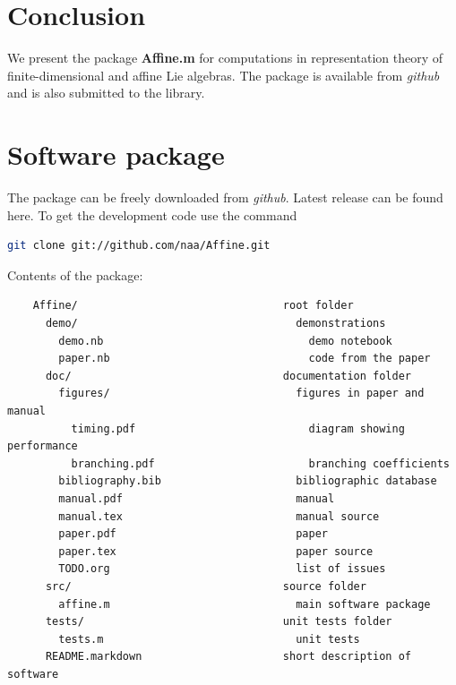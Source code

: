 \documentclass[preprint,12pt]{elsarticle}
\begin{document}
\section{Conclusion}
\label{sec:conclusion}
We present the package {\bf Affine.m} for computations in representation theory of finite-dimensional and affine Lie algebras. The package is available from {\it github} and is also submitted to the library.

\appendix

\section{Software package}
\label{package}
The package can be freely downloaded from {\it github}. Latest release can be found here. To get the development code use the command
\begin{lstlisting}[language=bash]
 git clone git://github.com/naa/Affine.git
\end{lstlisting}

Contents of the package:
\begin{verbatim}
    Affine/                                root folder
      demo/                                  demonstrations
        demo.nb                                demo notebook
        paper.nb                               code from the paper
      doc/                                 documentation folder
        figures/                             figures in paper and manual
          timing.pdf                           diagram showing performance
          branching.pdf                        branching coefficients
        bibliography.bib                     bibliographic database
        manual.pdf                           manual
        manual.tex                           manual source
        paper.pdf                            paper
        paper.tex                            paper source
        TODO.org                             list of issues
      src/                                 source folder
        affine.m                             main software package
      tests/                               unit tests folder
        tests.m                              unit tests
      README.markdown                      short description of software
\end{verbatim}


\end{document}

